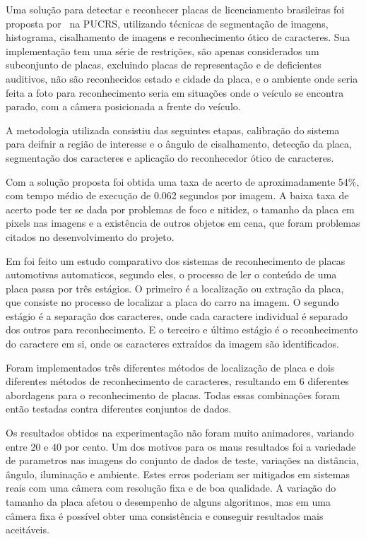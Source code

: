 
Uma solução para detectar e reconhecer placas de licenciamento brasileiras foi
proposta por~\cite{serro2012deteccao} na PUCRS, utilizando técnicas de
segmentação de imagens, histograma, cisalhamento de imagens e reconhecimento
ótico de caracteres. Sua implementação tem uma série de restrições, são apenas
considerados um subconjunto de placas, excluindo placas de representação e de
deficientes auditivos, não são reconhecidos estado e cidade da placa, e o
ambiente onde seria feita a foto para reconhecimento seria em situações onde o
veículo se encontra parado, com a câmera posicionada a frente do veículo.

A metodologia utilizada consistiu das seguintes etapas, calibração do sistema
para deifnir a região de interesse e o ângulo de cisalhamento, detecção da
placa, segmentação dos caracteres e aplicação do reconhecedor ótico de
caracteres.

Com a solução proposta foi obtida uma taxa de acerto de aproximadamente 54\%,
com tempo médio de execução de 0.062 segundos por imagem. A baixa taxa de acerto
pode ter se dada por problemas de foco e nitidez, o tamanho da placa em pixels
nas imagens e a existência de outros objetos em cena, que foram problemas
citados no desenvolvimento do projeto.

Em \cite{ahmad2015automatic} foi feito um estudo comparativo dos sistemas de
reconhecimento de placas automotivas automaticos, segundo eles, o processo de
ler o conteúdo de uma placa passa por três estágios. O primeiro é a localização
ou extração da placa, que consiste no processo de localizar a placa do carro na
imagem. O segundo estágio é a separação dos caracteres, onde cada caractere
individual é separado dos outros para reconhecimento. E o terceiro e último
estágio é o reconhecimento do caractere em si, onde os caracteres extraídos da
imagem são identificados.

Foram implementados três diferentes métodos de localização de placa e dois
diferentes métodos de reconhecimento de caracteres, resultando em 6 diferentes
abordagens para o reconhecimento de placas. Todas essas combinações foram então
testadas contra diferentes conjuntos de dados.

Os resultados obtidos na experimentação não foram muito animadores, variando
entre 20 e 40 por cento. Um dos motivos para os maus resultados foi a variedade
de parametros nas imagens do conjunto de dados de teste, variações na distância,
ângulo, iluminação e ambiente. Estes erros poderiam ser mitigados em sistemas
reais com uma câmera com resolução fixa e de boa qualidade. A variação do
tamanho da placa afetou o desempenho de alguns algoritmos, mas em uma câmera
fixa é possível obter uma consistência e conseguir resultados mais aceitáveis.

